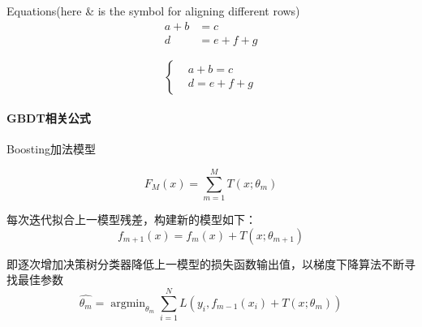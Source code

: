 \documentclass[UTF8]{ctexart}
\begin{document}
Equations(here \& is the symbol for aligning different rows)
\begin{align}
    a+b & =c     \\
    d   & =e+f+g
\end{align}

\[
    \left\{
    \begin{aligned}
         & a+b=c   \\
         & d=e+f+g
    \end{aligned}
    \right.
\]

\paragraph{GBDT相关公式}

Boosting加法模型

\begin{equation}
    F_M(x)=\sum_{m=1}^{M} T(x; \theta_m)
\end{equation}

每次迭代拟合上一模型残差，构建新的模型如下： 
    \[f_{m+1}(x)=f_{m}(x)+T(x; \theta_{m+1})\]

即逐次增加决策树分类器降低上一模型的损失函数输出值，以梯度下降算法不断寻找最佳参数
\begin{equation}
    \hat{\theta_m}=\mathop{\arg\min}_{\theta_m}\sum_{i=1}^{N}L(y_i, f_{m-1}(x_i)+T(x; \theta_m))
\end{equation}
\end{document}

